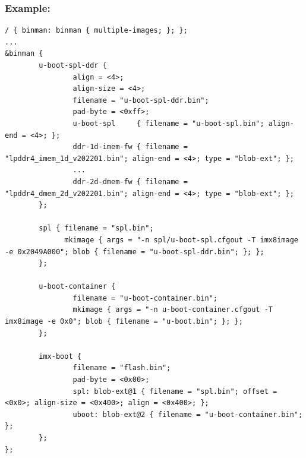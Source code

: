 \begin{frame}[fragile]
  \frametitle{Example: }
  \begin{verbatim}
/ { binman: binman { multiple-images; }; };
...
&binman {
        u-boot-spl-ddr {
                align = <4>;
                align-size = <4>;
                filename = "u-boot-spl-ddr.bin";
                pad-byte = <0xff>;
                u-boot-spl     { filename = "u-boot-spl.bin"; align-end = <4>; };
                ddr-1d-imem-fw { filename = "lpddr4_imem_1d_v202201.bin"; align-end = <4>; type = "blob-ext"; };
                ...
                ddr-2d-dmem-fw { filename = "lpddr4_dmem_2d_v202201.bin"; align-end = <4>; type = "blob-ext"; };
        };

        spl { filename = "spl.bin";
              mkimage { args = "-n spl/u-boot-spl.cfgout -T imx8image -e 0x2049A000"; blob { filename = "u-boot-spl-ddr.bin"; }; };
        };

        u-boot-container {
                filename = "u-boot-container.bin";
                mkimage { args = "-n u-boot-container.cfgout -T imx8image -e 0x0"; blob { filename = "u-boot.bin"; }; };
        };

        imx-boot {
                filename = "flash.bin";
                pad-byte = <0x00>;
                spl: blob-ext@1 { filename = "spl.bin"; offset = <0x0>; align-size = <0x400>; align = <0x400>; };
                uboot: blob-ext@2 { filename = "u-boot-container.bin"; };
        };
};
  \end{verbatim}
\end{frame}

